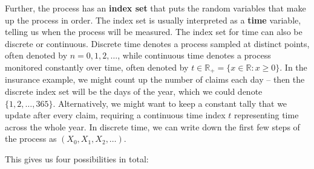 \documentclass[
  a4paper,
]{article}
\theoremstyle{definition}
\theoremstyle{definition}
\theoremstyle{definition}
\theoremstyle{remark}
\begin{document}
Further, the process has an \textbf{index set} that puts the random variables that make up the process in order. The index set is usually interpreted as a \textbf{time} variable, telling us when the process will be measured. The index set for time can also be discrete or continuous. Discrete time denotes a process sampled at distinct points, often denoted by \(n = 0,1,2,\dots\), while continuous time denotes a process monitored constantly over time, often denoted by \(t \in \mathbb R_+ = \{x \in \mathbb R : x \geq 0\}\). In the insurance example, we might count up the number of claims each day -- then the discrete index set will be the days of the year, which we could denote \(\{1,2,\dots,365\}\). Alternatively, we might want to keep a constant tally that we update after every claim, requiring a continuous time index \(t\) representing time across the whole year. In discrete time, we can write down the first few steps of the process as \((X_0, X_1, X_2, \dots)\).

This gives us four possibilities in total:
\end{document}
